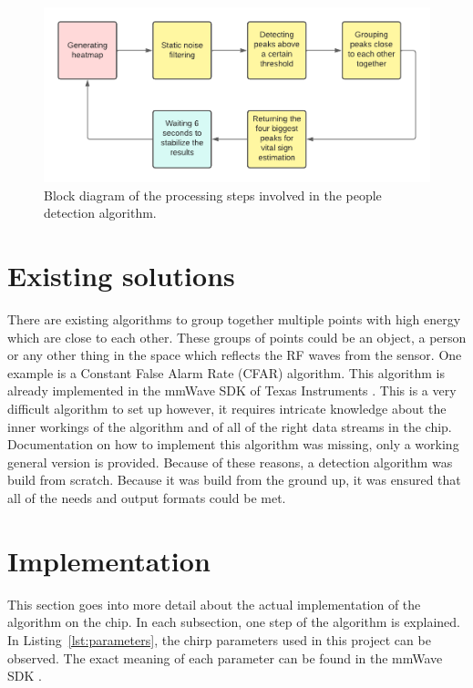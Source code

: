 \begin{figure}[t]
\centering
\includegraphics[width=.9\textwidth]{figures/people_detection/People detection algorithm.pdf}
\caption{Block diagram of the processing steps involved in the people detection algorithm.}
\label{fig:people_detection_block_diagram}
\end{figure}

\section{Existing solutions}
There are existing algorithms to group together multiple points with high energy which are close to each other. These groups of points could be an object, a person or any other thing in the space which reflects the RF waves from the sensor. One example is a Constant False Alarm Rate (CFAR) algorithm. This algorithm is already implemented in the mmWave SDK of Texas Instruments \cite{mmwavesdk_website}. This is a very difficult algorithm to set up however, it requires intricate knowledge about the inner workings of the algorithm and of all of the right data streams in the chip. Documentation on how to implement this algorithm was missing, only a working general version is provided. Because of these reasons, a detection algorithm was build from scratch. Because it was build from the ground up, it was ensured that all of the needs and output formats could be met.

\section{Implementation}
\label{sec:people_detection_implementation}
This section goes into more detail about the actual implementation of the algorithm on the chip. In each subsection, one step of the algorithm is explained. In Listing~\ref{lst:parameters}, the chirp parameters used in this project can be observed. The exact meaning of each parameter can be found in the mmWave SDK \cite{mmwavesdk_website}.

